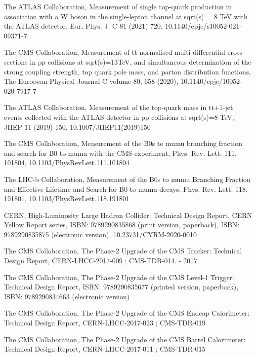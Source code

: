 \begin{thebibliography}{20}
  {The ATLAS Collaboration, Measurement of single top-quark production in association with a W  boson in the single-lepton channel at sqrt(s) = 8 TeV with the ATLAS detector, Eur. Phys. J. C 81 (2021) 720, 10.1140/epjc/s10052-021-09371-7}
  
  {The CMS Collaboration, Measurement of tt normalised multi-differential cross sections in pp collisions at sqrt(s)=13TeV, and simultaneous determination of the strong coupling strength, top quark pole mass, and parton distribution functions, The European Physical Journal C volume 80, 658 (2020), 10.1140/epjc/10052-020-7917-7}

  {The ATLAS Collaboration, Measurement of the top-quark mass in tt+1-jet events collected with the ATLAS detector in pp collisions at sqrt(s)=8 TeV, JHEP 11 (2019) 150, 10.1007/JHEP11(2019)150}

  {The CMS Collaboration, Measurement of the B0s to mumu branching fraction and search for B0 to mumu with the CMS experiment, Phys. Rev. Lett. 111, 101804, 10.1103/PhysRevLett.111.101804}
  
  {The LHC-b Collaboration, Measurement of the B0s to mumu Branching Fraction and Effective Lifetime and Search for B0 to mumu decays, Phys. Rev. Lett. 118, 191801, 10.1103/PhysRevLett.118.191801}
  
  {CERN, High-Luminosity Large Hadron Collider: Technical Design Report, CERN Yellow Report series, ISBN: 9789290835868 (print version, paperback), ISBN: 9789290835875 (electronic version), 10.23731/CYRM-2020-0010}
 
  {The CMS Collaboration, The Phase-2 Upgrade of the CMS Tracker: Technical Design Report, CERN-LHCC-2017-009 ; CMS-TDR-014. - 2017}
  
  {The CMS Collaboration, The Phase-2 Upgrade of the CMS Level-1 Trigger: Technical Design Report, ISBN: 9789290835677 (printed version, paperback), ISBN: 9789290834663 (electronic version)}
  
  {The CMS Collaboration, The Phase-2 Upgrade of the CMS Endcap Calorimeter:
Technical Design Report, CERN-LHCC-2017-023 ; CMS-TDR-019}

  {The CMS Collaboration, The Phase-2 Upgrade of the CMS Barrel Calorimeter:
Technical Design Report, CERN-LHCC-2017-011 ; CMS-TDR-015}


\end{thebibliography}
